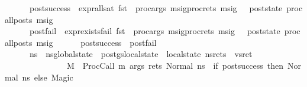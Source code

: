 \begin{isabellebody}
\ \ \ \ \ \ post{\isacharunderscore}{\kern0pt}success\ {\isacharequal}{\kern0pt}\ expr{\isacharunderscore}{\kern0pt}all{\isacharunderscore}{\kern0pt}sat\ {\isacharparenleft}{\kern0pt}fst\ {\isasymLambda}{\isacharcomma}{\kern0pt}\ {\isacharparenleft}{\kern0pt}proc{\isacharunderscore}{\kern0pt}args\ msig{\isacharparenright}{\kern0pt}{\isacharat}{\kern0pt}{\isacharparenleft}{\kern0pt}proc{\isacharunderscore}{\kern0pt}rets\ msig{\isacharparenright}{\kern0pt}{\isacharparenright}{\kern0pt}\ {\isasymGamma}\ {\isasymOmega}\ post{\isacharunderscore}{\kern0pt}state\ {\isacharparenleft}{\kern0pt}proc{\isacharunderscore}{\kern0pt}all{\isacharunderscore}{\kern0pt}posts\ msig{\isacharparenright}{\kern0pt}{\isacharsemicolon}{\kern0pt}\isanewline
\ \ \ \ \ \ post{\isacharunderscore}{\kern0pt}fail\ {\isacharequal}{\kern0pt}\ expr{\isacharunderscore}{\kern0pt}exists{\isacharunderscore}{\kern0pt}fail\ {\isacharparenleft}{\kern0pt}fst\ {\isasymLambda}{\isacharcomma}{\kern0pt}\ {\isacharparenleft}{\kern0pt}proc{\isacharunderscore}{\kern0pt}args\ msig{\isacharparenright}{\kern0pt}{\isacharat}{\kern0pt}{\isacharparenleft}{\kern0pt}proc{\isacharunderscore}{\kern0pt}rets\ msig{\isacharparenright}{\kern0pt}{\isacharparenright}{\kern0pt}\ {\isasymGamma}\ {\isasymOmega}\ post{\isacharunderscore}{\kern0pt}state\ {\isacharparenleft}{\kern0pt}proc{\isacharunderscore}{\kern0pt}all{\isacharunderscore}{\kern0pt}posts\ msig{\isacharparenright}{\kern0pt}{\isacharsemicolon}{\kern0pt}\isanewline
\ \ \ \ \ \ post{\isacharunderscore}{\kern0pt}success\ {\isasymor}\ post{\isacharunderscore}{\kern0pt}fail{\isacharsemicolon}{\kern0pt}\isanewline
\ \ \ \ \ \ n{\isacharunderscore}{\kern0pt}s{\isacharprime}{\kern0pt}\ {\isacharequal}{\kern0pt}\ n{\isacharunderscore}{\kern0pt}s{\isasymlparr}global{\isacharunderscore}{\kern0pt}state\ {\isacharcolon}{\kern0pt}{\isacharequal}{\kern0pt}\ post{\isacharunderscore}{\kern0pt}gs{\isasymrparr}{\isasymlparr}local{\isacharunderscore}{\kern0pt}state\ {\isacharcolon}{\kern0pt}{\isacharequal}{\kern0pt}\ {\isacharparenleft}{\kern0pt}local{\isacharunderscore}{\kern0pt}state\ n{\isacharunderscore}{\kern0pt}s{\isacharparenright}{\kern0pt}{\isacharparenleft}{\kern0pt}rets\ {\isacharbrackleft}{\kern0pt}{\isasymmapsto}{\isacharbrackright}{\kern0pt}\ vs{\isacharunderscore}{\kern0pt}ret{\isacharparenright}{\kern0pt}{\isasymrparr}\ {\isasymrbrakk}\ {\isasymLongrightarrow}\isanewline
\ \ \ \ \ \ \ \ \ \ \ \ \ \ \ M{\isacharcomma}{\kern0pt}{\isasymLambda}{\isacharcomma}{\kern0pt}{\isasymGamma}{\isacharcomma}{\kern0pt}{\isasymOmega}\ {\isasymturnstile}\ {\isasymlangle}ProcCall\ m\ args\ rets{\isacharcomma}{\kern0pt}\ Normal\ n{\isacharunderscore}{\kern0pt}s{\isasymrangle}\ {\isasymrightarrow}\ {\isacharparenleft}{\kern0pt}if\ post{\isacharunderscore}{\kern0pt}success\ then\ Normal\ n{\isacharunderscore}{\kern0pt}s{\isacharprime}{\kern0pt}\ else\ Magic{\isacharparenright}{\kern0pt}{\isachardoublequoteclose}\isanewline

\end{isabellebody}
